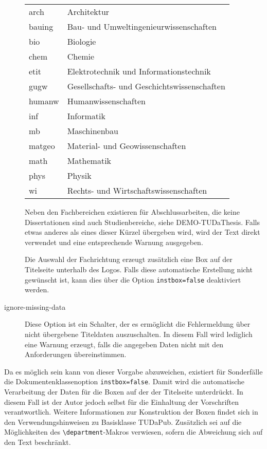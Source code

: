 \documentclass[
	ngerman,
	ruledheaders=chapter,%
	class=book,%
	thesis={
		type=dr,
		dr=rernat
	},
	accentcolor=9c,%
	custommargins=true,%
	marginpar=false,%
	fontsize=11pt,%
]{tudapub}
\let\code\texttt
\begin{document}
\begin{description}
	\begin{tabular}{@{}l@{${}\to{}$}l@{}}
		arch  & Architektur\\
		bauing& Bau- und Umweltingenieurwissenschaften\\
		bio   &Biologie\\
		chem  &Chemie\\
		etit  &Elektrotechnik und Informationstechnik\\
		gugw  &Gesellschafts- und Geschichtswissenschaften\\
		humanw&Humanwissenschaften\\
		inf   &Informatik\\
		mb    &Maschinenbau\\
		matgeo&Material- und Geowissenschaften\\
		math  &Mathematik\\
		phys  &Physik\\
		wi    &Rechts- und Wirtschaftswissenschaften
	\end{tabular}

	Neben den Fachbereichen existieren für Abschlussarbeiten, die keine Dissertationen sind auch Studienbereiche, siehe DEMO-TUDaThesis.
	Falls etwas anderes als eines dieser Kürzel übergeben wird, wird der Text direkt verwendet und eine entsprechende Warnung ausgegeben.

	Die Auswahl der Fachrichtung erzeugt zusätzlich eine Box auf der Titelseite unterhalb des Logos. Falls diese automatische Erstellung nicht gewünscht ist, kann dies über die Option \code{instbox=false} deaktiviert werden.
\item[ignore-missing-data] Diese Option ist ein Schalter, der es ermöglicht die Fehlermeldung über nicht übergebene Titeldaten auszuschalten. In diesem Fall wird lediglich eine Warnung erzeugt, falls die angegeben Daten nicht mit den Anforderungen übereinstimmen.
\end{description}

Da es möglich sein kann von dieser Vorgabe abzuweichen, existiert für Sonderfälle die Dokumentenklassenoption \code{instbox=false}. Damit wird die automatische Verarbeitung der Daten für die Boxen auf der der Titelseite unterdrückt. In diesem Fall ist der Autor jedoch selbst für die Einhaltung der Vorschriften verantwortlich. Weitere Informationen zur Konstruktion der Boxen findet sich in den Verwendungshinweisen zu Basisklasse TUDaPub. Zusätzlich sei auf die Möglichkeiten des \code{\textbackslash{}department}-Makros verwiesen, sofern die Abweichung sich auf den Text beschränkt.
\end{document}
